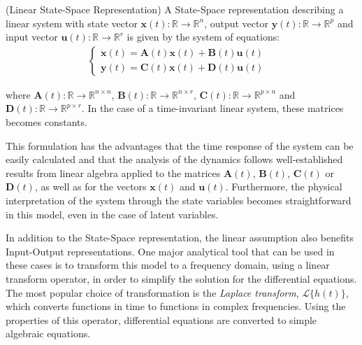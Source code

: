 \documentclass[a4paper,11pt]{book}
\numberwithin{figure}{chapter}
\numberwithin{equation}{chapter}
\numberwithin{table}{chapter}
\theoremstyle{definition}
\newtheorem{definition}{Definition}[chapter]
\newcounter{boxed-theorem}
\newcounter{boxed-definition}
\newenvironment{boxed-definition}[1]
{\begin{shaded} \begin{definition}{#1}}
{\end{definition} \end{shaded}}
\begin{document}
\begin{boxed-definition}{(Linear State-Space Representation)}
	A State-Space representation describing a linear system with state vector $\bm{x}(t) : \mathbb{R} \rightarrow \mathbb{R}^{n}$, output vector $\bm{y}(t) : \mathbb{R} \rightarrow \mathbb{R}^{p}$ and input vector $\bm{u}(t) : \mathbb{R} \rightarrow \mathbb{R}^{r}$ is given by the system of equations: 
	\begin{align} \label{eq:SSRepr04}
	\begin{cases}
		\dot{\bm{x}}(t) = \bm{A}(t) \bm{x}(t) + \bm{B}(t) \bm{u}(t) & \\
		\bm{y}(t) = \bm{C}(t) \bm{x}(t) + \bm{D}(t) \bm{u}(t) &
	\end{cases}
	\end{align}

	\noindent where $\bm{A}(t) : \mathbb{R} \rightarrow \mathbb{R}^{n \times n}$, $\bm{B}(t) : \mathbb{R} \rightarrow \mathbb{R}^{n \times r}$, $\bm{C}(t) : \mathbb{R} \rightarrow \mathbb{R}^{p \times n}$ and $\bm{D}(t) : \mathbb{R} \rightarrow \mathbb{R}^{p \times r}$. In the case of a time-invariant linear system, these matrices becomes constants. 
\end{boxed-definition}

This formulation has the advantages that the time response of the system can be easily calculated and that the analysis of the dynamics follows well-established results from linear algebra applied to the matrices $\bm{A}(t)$, $\bm{B}(t)$, $\bm{C}(t)$ or $\bm{D}(t)$, as well as for the vectors $\bm{x}(t)$ and $\bm{u}(t)$. Furthermore, the physical interpretation of the system through the state variables becomes straightforward in this model, even in the case of latent variables. 

In addition to the State-Space representation, the linear assumption also benefits Input-Output representations. One major analytical tool that can be used in these cases is to transform this model to a frequency domain, using a linear transform operator, in order to simplify the solution for the differential equations. The most popular choice of transformation is the \textit{Laplace transform}, $\mathcal{L}\{ h(t) \}$, which converts functions in time to functions in complex frequencies. Using the properties of this operator, differential equations are converted to simple algebraic equations.
\end{document}

